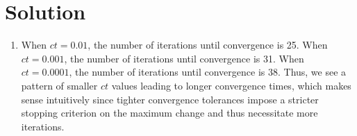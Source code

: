 \documentclass[submit]{../harvardml}
\newenvironment{solution}
  {\color{blue}\section*{Solution}}
{}
\begin{document}
\begin{solution}
\begin{enumerate}
\begin{enumerate}
\begin{figure}[htbp]
{              }\hfill
            \end{figure}

            \newpage 
            \item When $ct = 0.01$, the number of iterations until convergence is 25. When $ct = 0.001$, the number of iterations until convergence is 31. When $ct = 0.0001$, the number of iterations until convergence is 38. Thus, we see a pattern of smaller $ct$ values leading to longer convergence times, which makes sense intuitively since tighter convergence tolerances impose a stricter stopping criterion on the maximum change and thus necessitate more iterations.
            \begin{figure}[htbp]
              \centering
              \hfill
\end{figure}
\end{enumerate}
\end{enumerate}
\end{solution}
\end{document}
